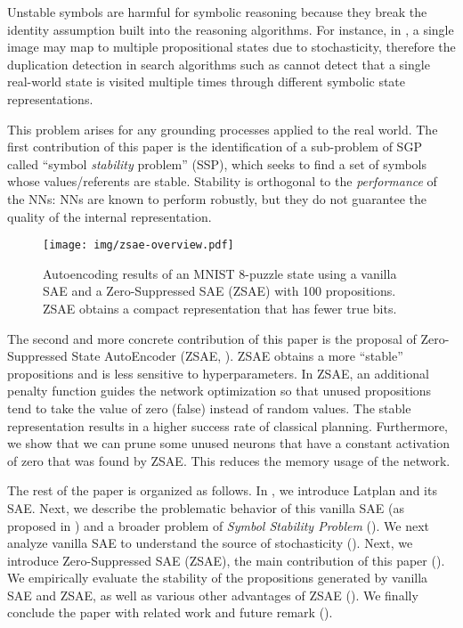Unstable symbols are harmful for symbolic reasoning because
they break the identity assumption built into the reasoning algorithms.
For instance, in \latentplanner, 
a single image may map to multiple propositional states due to stochasticity,
therefore the duplication detection in search algorithms such as \astar \cite{hart1968formal}
cannot detect that a single real-world state is visited multiple times through
different symbolic state representations.

This problem arises for any grounding processes applied to the real world.
The first contribution of this paper is the identification of a sub-problem of SGP
called ``symbol \emph{stability} problem'' (SSP), which seeks to find a set of symbols
whose values/referents are stable.
Stability is orthogonal to the \emph{performance} of the NNs:
NNs are known to perform robustly, but they do not guarantee
the quality of the internal representation.

\begin{figure}[tb]
 \centering
 \texttt{[image: img/zsae-overview.pdf]}
 \caption{
Autoencoding results of an MNIST 8-puzzle state
using a vanilla SAE and a Zero-Suppressed SAE (ZSAE) with 100 propositions.
ZSAE obtains a compact representation that has fewer true bits.}
 \label{zsae-overview}
\end{figure}

The second and more concrete contribution of this paper is
the proposal of Zero-Suppressed State AutoEncoder (ZSAE, ).
ZSAE obtains a more ``stable'' propositions and is less sensitive to hyperparameters.
In ZSAE, an additional penalty function
guides the network optimization so that unused propositions tend to 
take the value of zero (false) instead of random values.
The stable representation results in a higher success rate of classical planning.
Furthermore,
we show that we can prune some unused neurons
that have a constant activation of zero that was found by ZSAE.
This reduces the memory usage of the network.

The rest of the paper is organized as follows.
In , we introduce Latplan \cite{Asai2018} and its SAE.
Next, we describe the problematic behavior of this vanilla SAE (as proposed in \cite{Asai2018}) and
a broader problem of \emph{Symbol Stability Problem} ().
We next analyze vanilla SAE to understand the source of stochasticity ().
Next, we introduce Zero-Suppressed SAE (ZSAE), the main contribution of this paper ().
We empirically evaluate the stability of the propositions generated by vanilla SAE and ZSAE,
as well as various other advantages of ZSAE ().
We finally conclude the paper with related work and future remark ().


